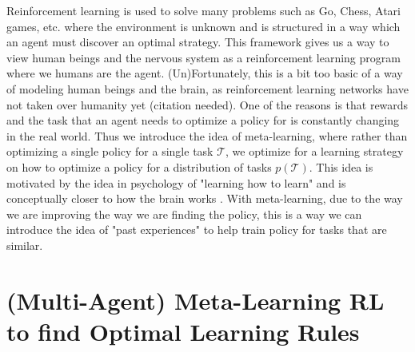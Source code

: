 \documentclass{article}
\begin{document}
Reinforcement learning is used to solve many problems such as Go, Chess, 
Atari games, etc. where the environment is unknown and is structured in 
a way which an agent must discover an optimal strategy. This framework 
gives us a way to view human beings and the nervous system as a 
reinforcement learning program where we humans are the agent. 
(Un)Fortunately, this is a bit too basic of a way of modeling human 
beings and the brain, as reinforcement learning networks have not taken 
over humanity yet (citation needed). One of the reasons is that rewards 
and the task that an agent needs to optimize a policy for is constantly 
changing in the real world. Thus we introduce the idea of meta-learning, 
where rather than optimizing a single policy for a single task $\mathcal{T}$, 
we optimize for a learning strategy on how to optimize a policy for a distribution 
of tasks $p(\mathcal{T})$. This idea is motivated by the idea in psychology of 
 "learning how to learn" and is conceptually closer to how the brain 
works \cite{wang2018pfc}. With meta-learning, due to
the way we are improving the way we are finding the policy, this is a way
we can introduce the idea of "past experiences" to help train policy for 
tasks that are similar.

\section{(Multi-Agent) Meta-Learning RL to find Optimal Learning Rules}
\end{document}
